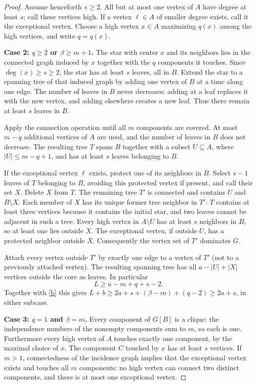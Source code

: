 \documentclass[11pt,a4paper]{article}
\begin{document}
\begin{proof}
\medskip\noindent
Assume henceforth $s\ge2$. All but at most one vertex of $A$ have degree at least $s$; call these vertices high. If a vertex $\ell\in A$ of smaller degree exists, call it the exceptional vertex. Choose a high vertex $x\in A$ maximizing $q(x)$ among the high vertices, and write $q=q(x)$.

\medskip\noindent
\textbf{Case 2: $q\ge2$ or $\beta\ge m+1$.}
The star with center $x$ and its neighbors lies in the connected graph induced by $x$ together with the $q$ components it touches. Since $\deg(x)\ge s\ge2$, the star has at least $s$ leaves, all in $B$. Extend the star to a spanning tree of that induced graph by adding one vertex of $B$ at a time along one edge. The number of leaves in $B$ never decreases: adding at a leaf replaces it with the new vertex, and adding elsewhere creates a new leaf. Thus there remain at least $s$ leaves in $B$.

Apply the connection operation until all $m$ components are covered. At most $m-q$ additional vertices of $A$ are used, and the number of leaves in $B$ does not decrease. The resulting tree $T$ spans $B$ together with a subset $U\subseteq A$, where $|U|\le m-q+1$, and has at least $s$ leaves belonging to $B$.

If the exceptional vertex $\ell$ exists, protect one of its neighbors in $B$. Select $s-1$ leaves of $T$ belonging to $B$, avoiding this protected vertex if present, and call their set $X$. Delete $X$ from $T$. The remaining tree $T'$ is connected and contains $U$ and $B\setminus X$. Each member of $X$ has its unique former tree neighbor in $T'$: $T$ contains at least three vertices because it contains the initial star, and two leaves cannot be adjacent in such a tree. Every high vertex in $A\setminus U$ has at least $s$ neighbors in $B$, so at least one lies outside $X$. The exceptional vertex, if outside $U$, has a protected neighbor outside $X$. Consequently the vertex set of $T'$ dominates $G$.

Attach every vertex outside $T'$ by exactly one edge to a vertex of $T'$ (not to a previously attached vertex). The resulting spanning tree has all $a-|U|+|X|$ vertices outside the core as leaves. In particular
\[
 L\ge a-m+q+s-2.
\]
Together with \eqref{b} this gives $L+b\ge2a+s+(\beta-m)+(q-2)\ge2a+s$, in either subcase.

\medskip\noindent
\textbf{Case 3: $q=1$ and $\beta=m$.}
Every component of $G[B]$ is a clique: the independence numbers of the nonempty components sum to $m$, so each is one. Furthermore every high vertex of $A$ touches exactly one component, by the maximal choice of $x$. The component $C$ touched by $x$ has at least $s$ vertices. If $m>1$, connectedness of the incidence graph implies that the exceptional vertex exists and touches all $m$ components: no high vertex can connect two distinct components, and there is at most one exceptional vertex.


\end{proof}
\end{document}
